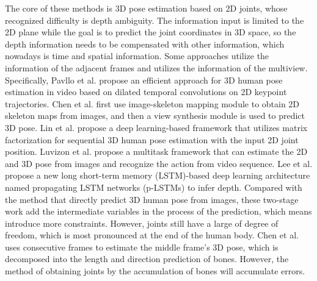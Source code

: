 \documentclass[journal]{IEEEtran}
\begin{document}
The core of these methods is 3D pose estimation based on 2D joints, whose recognized difficulty is depth ambiguity. The information input is limited to the 2D plane while the goal is to predict the joint coordinates in 3D space, so the depth information needs to be compensated with other information, which nowadays is time and spatial information. {Some approaches\cite{20183D,2019Lin,Luvizon_2018_CVPR,2018Propagating} utilize the information of the adjacent frames and\cite{2019weakly} utilizes the information of the multiview. Specifically, Pavllo et al.\cite{20183D} propose an efficient approach for 3D human pose estimation in video based on dilated temporal convolutions on 2D keypoint trajectories. Chen et al.\cite{2019weakly} first use image-skeleton mapping module to obtain 2D skeleton maps from images, and then a view synthesis module is used to predict 3D pose. Lin et al.\cite{2019Lin} propose a deep learning-based framework that utilizes matrix factorization for sequential 3D human pose estimation with the input 2D joint position. Luvizon et al.\cite{Luvizon_2018_CVPR} propose a multitask framework that can estimate the 2D and 3D pose from images and recognize the action from video sequence. Lee et al.\cite{2018Propagating} propose a new long short-term memory (LSTM)-based deep learning architecture named propagating LSTM networks (p-LSTMs) to infer depth. Compared with the method that directly predict 3D human pose from images, these two-stage work add the intermediate variables in the process of the prediction, which means introduce more constraints. However, joints still have a large of degree of freedom, which is most pronounced at the end of the human body. Chen et al.\cite{2020Anatomy} uses consecutive frames to estimate the middle frame’s 3D pose, which is decomposed into the length and direction prediction of bones. However, the method of obtaining joints by the accumulation of bones will accumulate errors.}
\end{document}
